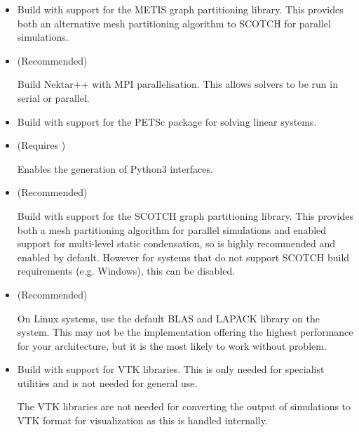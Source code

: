 \begin{itemize}
    \item {}

    Build \nekpp with support for the METIS graph partitioning library. This
    provides both an alternative mesh partitioning algorithm to SCOTCH for
    parallel simulations.

    \item {} (Recommended)

    Build Nektar++ with MPI parallelisation. This allows solvers to be run in
    serial or parallel.

    \item {}

    Build \nekpp with support for the PETSc package for solving linear systems.

    \item {} (Requires )
    
    Enables the generation of Python3 interfaces.
    
    \item {} (Recommended)

    Build \nekpp with support for the SCOTCH graph partitioning library. This
    provides both a mesh partitioning algorithm for parallel simulations and
    enabled support for multi-level static condensation, so is highly
    recommended and enabled by default. However for systems that do not support
    SCOTCH build requirements (e.g. Windows), this can be disabled.

    \item {} (Recommended)

    On Linux systems, use the default BLAS and LAPACK library on the system.
    This may not be the implementation offering the highest performance for your
    architecture, but it is the most likely to work without problem.

    \item {}

    Build \nekpp with support for VTK libraries. This is only needed for
    specialist utilities and is not needed for general use.

    \begin{notebox}
    The VTK libraries are not needed for converting the output of simulations to
    VTK format for visualization as this is handled internally.
    \end{notebox}
\end{itemize}

